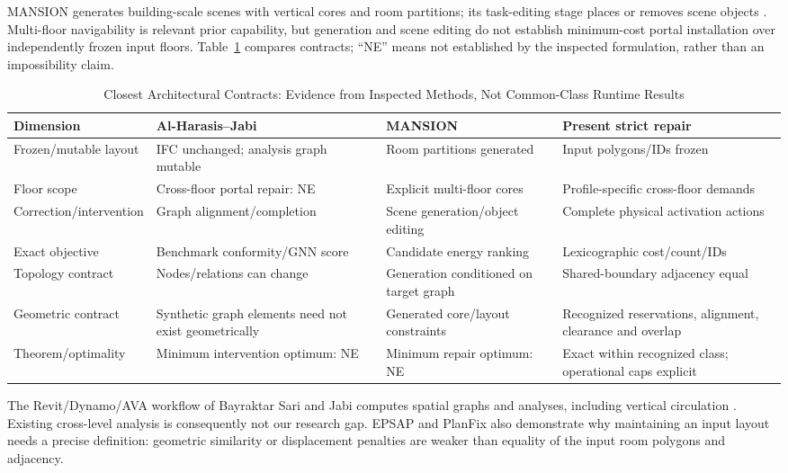 \documentclass[conference]{IEEEtran}
\begin{document}
MANSION generates building-scale scenes with vertical cores and room partitions; its task-editing stage places or removes scene objects \cite{mansion}. Multi-floor navigability is relevant prior capability, but generation and scene editing do not establish minimum-cost portal installation over independently frozen input floors. Table~\ref{tab:related} compares contracts; ``NE'' means not established by the inspected formulation, rather than an impossibility claim.

\begin{table}[t]
\caption{Closest Architectural Contracts: Evidence from Inspected Methods, Not Common-Class Runtime Results}\label{tab:related}
\centering\footnotesize\setlength{\tabcolsep}{3pt}
\begin{tabular}{p{}p{}p{}p{}}
\toprule Dimension & Al-Harasis--Jabi \cite{graphrepair} & MANSION \cite{mansion} & Present strict repair \\\midrule
Frozen/mutable layout & IFC unchanged; analysis graph mutable & Room partitions generated & Input polygons/IDs frozen\\
Floor scope & Cross-floor portal repair: NE & Explicit multi-floor cores & Profile-specific cross-floor demands\\
Correction/intervention & Graph alignment/completion & Scene generation/object editing & Complete physical activation actions\\
Exact objective & Benchmark conformity/GNN score & Candidate energy ranking & Lexicographic cost/count/IDs\\
Topology contract & Nodes/relations can change & Generation conditioned on target graph & Shared-boundary adjacency equal\\
Geometric contract & Synthetic graph elements need not exist geometrically & Generated core/layout constraints & Recognized reservations, alignment, clearance and overlap\\
Theorem/optimality & Minimum intervention optimum: NE & Minimum repair optimum: NE & Exact within recognized class; operational caps explicit\\
\bottomrule\end{tabular}\end{table}

The Revit/Dynamo/AVA workflow of Bayraktar Sari and Jabi computes spatial graphs and analyses, including vertical circulation \cite{ava}. Existing cross-level analysis is consequently not our research gap. EPSAP and PlanFix also demonstrate why maintaining an input layout needs a precise definition: geometric similarity or displacement penalties are weaker than equality of the input room polygons and adjacency.
\end{document}
